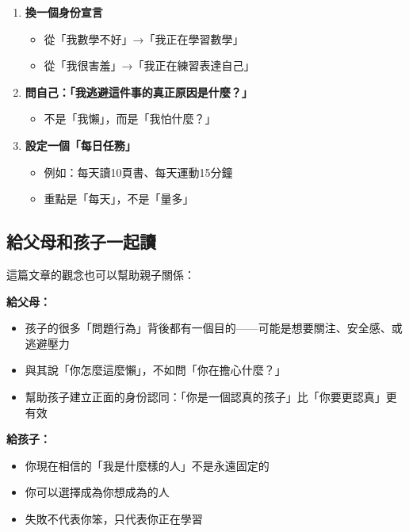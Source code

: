 \documentclass[12pt,a4paper]{article}
\begin{document}
\begin{tcolorbox}[colback=yellow!10!white,colframe=orange!75!black,title=\textbf{學生可以嘗試的事}]
\begin{enumerate}
    \item \textbf{換一個身份宣言}
    \begin{itemize}
        \item 從「我數學不好」→「我正在學習數學」
        \item 從「我很害羞」→「我正在練習表達自己」
    \end{itemize}

    \item \textbf{問自己：「我逃避這件事的真正原因是什麼？」}
    \begin{itemize}
        \item 不是「我懶」，而是「我怕什麼？」
    \end{itemize}

    \item \textbf{設定一個「每日任務」}
    \begin{itemize}
        \item 例如：每天讀10頁書、每天運動15分鐘
        \item 重點是「每天」，不是「量多」
    \end{itemize}
\end{enumerate}
\end{tcolorbox}

\subsection{給父母和孩子一起讀}

這篇文章的觀念也可以幫助親子關係：

\textbf{給父母：}
\begin{itemize}
    \item 孩子的很多「問題行為」背後都有一個目的——可能是想要關注、安全感、或逃避壓力
    \item 與其說「你怎麼這麼懶」，不如問「你在擔心什麼？」
    \item 幫助孩子建立正面的身份認同：「你是一個認真的孩子」比「你要更認真」更有效
\end{itemize}

\textbf{給孩子：}
\begin{itemize}
    \item 你現在相信的「我是什麼樣的人」不是永遠固定的
    \item 你可以選擇成為你想成為的人
    \item 失敗不代表你笨，只代表你正在學習
\end{itemize}
\end{document}
